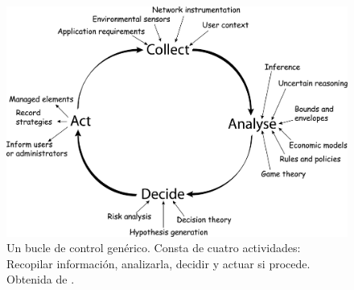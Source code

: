 \begin{figure}[h]
  \centering
  \includegraphics[scale=0.065]{cap_introduccion/images/feedback-loop}
  \caption[Un bucle de control genérico. Consta de cuatro actividades: Recopilar información, analizarla, decidir y actuar si procede.]{Un bucle de control genérico. Consta de cuatro actividades: Recopilar información, analizarla, decidir y actuar si procede. Obtenida de \cite{dobsonSurveyAutonomicCommunications2006}.}
  \label{fig:bucle-control}
\end{figure}

